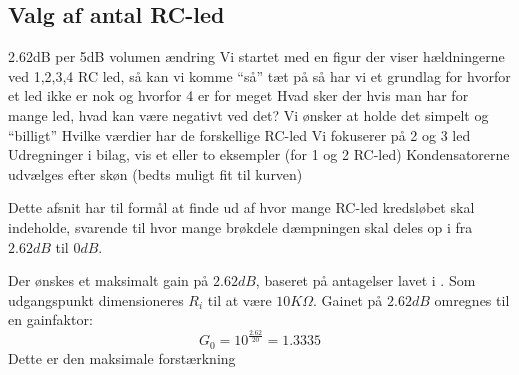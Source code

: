 \subsection{Valg af antal RC-led}
\label{ValgAfAntalRCLed}
2.62dB per 5dB volumen ændring
Vi startet med en figur der viser hældningerne ved 1,2,3,4 RC led, så kan vi komme ``så'' tæt på
så har vi et grundlag for hvorfor et led ikke er nok og hvorfor 4 er for meget
Hvad sker der hvis man har for mange led, hvad kan være negativt ved det? Vi ønsker at holde det simpelt og ``billigt'' 
Hvilke værdier har de forskellige RC-led
Vi fokuserer på 2 og 3 led
Udregninger i bilag, vis et eller to eksempler (for 1 og 2 RC-led) 
Kondensatorerne udvælges efter skøn (bedts muligt fit til kurven)

Dette afsnit har til formål at finde ud af hvor mange RC-led kredsløbet skal indeholde, svarende til hvor mange brøkdele dæmpningen skal deles op i fra $2.62dB$ til $0dB$.


Der ønskes et maksimalt gain på $2.62dB$, baseret på antagelser lavet i .
Som udgangspunkt dimensioneres $R_i$ til at være $10K\Omega$.
Gainet på $2.62dB$ omregnes til en gainfaktor:
\begin{equation}
	G_0 = 10^{\frac{2.62}{20}} = 1.3335
\end{equation}
\noindent
Dette er den maksimale forstærkning 



